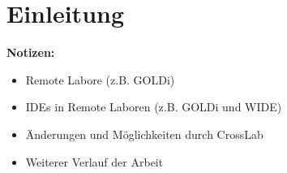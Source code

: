 \chapter{Einleitung}\label{section:einleitung}

\begin{note}
    \textbf{Notizen:}
    \begin{itemize}
        \item Remote Labore (z.B. GOLDi)
        \item IDEs in Remote Laboren (z.B. GOLDi und WIDE)
        \item Änderungen und Möglichkeiten durch CrossLab
        \item Weiterer Verlauf der Arbeit
    \end{itemize}
\end{note}



